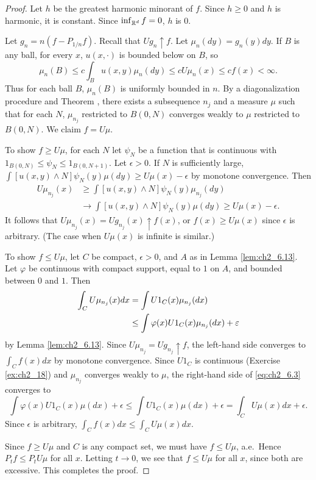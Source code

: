 \begin{proof}
Let $h$ be the greatest harmonic minorant of $f$. Since $h \geq 0$ and $h$ is harmonic, it is constant. Since $\inf_{\R^d} f = 0$, $h$ is $0$.

Let $g_n = n(f - P_{1/n}f)$. Recall that $Ug_n \uparrow f$. Let $\mu_n(dy) = g_n(y)dy$. If $B$ is any ball, for every $x$, $u(x,\cdot)$ is bounded below on $B$, so
\pagebreak
\[
    \mu_n(B) \leq c\int_B u(x,y)\mu_n(dy) \leq cU\mu_n(x) \leq cf(x) < \infty.
\]
Thus for each ball $B$, $\mu_n(B)$ is uniformly bounded in $n$. By a diagonalization procedure and Theorem , there exists a subsequence $n_j$ and a measure $\mu$ such that for each $N$, $\mu_{n_j}$ restricted to $B(0,N)$ converges weakly to $\mu$ restricted to $B(0,N)$. We claim $f = U\mu$.

To show $f \geq U\mu$, for each $N$ let $\psi_N$ be a function that is continuous
with $1_{B(0,N)} \leq \psi_N \leq 1_{B(0,N+1)}$. Let $\epsilon > 0$. If $N$ is sufficiently large, $\int[u(x,y) \wedge N]\psi_N(y)\mu(dy) \geq U\mu(x) - \epsilon$ by monotone convergence. Then
\begin{align*}
    U\mu_{n_j}(x) &\geq \int[u(x,y) \wedge N]\psi_N(y)\mu_{n_j}(dy) \\
    &\to \int[u(x,y) \wedge N]\psi_N(y)\mu(dy) \geq U\mu(x) - \epsilon.
\end{align*}
It follows that $U\mu_{n_j}(x) = Ug_{n_j}(x) \uparrow f(x)$, or $f(x) \geq U\mu(x)$ since $\epsilon$ is arbitrary. (The case when $U\mu(x)$ is infinite is similar.)

To show $f \leq U\mu$, let $C$ be compact, $\epsilon > 0$, and $A$ as in Lemma \ref{lem:ch2_6.13}. Let $\varphi$ be continuous with compact support, equal to $1$ on $A$, and bounded between $0$ and $1$. Then
\begin{align}\label{eq:ch2_6.3}
    \int_C U\mu_{n_j}(x)dx &= \int U1_C(x)\mu_{n_j}(dx) \\
    &\leq \int \varphi(x)U1_C(x)\mu_{n_j}(dx) + \epsilon \notag
\end{align}
by Lemma \ref{lem:ch2_6.13}. Since $U\mu_{n_j} = Ug_{n_j} \uparrow f$, the left-hand side converges to $\int_C f(x)dx$ by monotone convergence. Since $U1_C$ is continuous (Exercise \ref{ex:ch2_18}) and $\mu_{n_j}$ converges weakly to $\mu$, the right-hand side of \eqref{eq:ch2_6.3} converges to
\[
    \int \varphi(x)U1_C(x)\mu(dx) + \epsilon \leq \int U1_C(x)\mu(dx) + \epsilon = \int_C U\mu(x)dx + \epsilon.
\]
Since $\epsilon$ is arbitrary, $\int_C f(x)dx \leq \int_C U\mu(x)dx$.

Since $f \geq U\mu$ and $C$ is any compact set, we must have $f \leq U\mu$, a.e.\ Hence $P_tf \leq P_tU\mu$ for all $x$. Letting $t \to 0$, we see that $f \leq U\mu$ for all $x$, since both are excessive. This completes the proof.
\end{proof}

